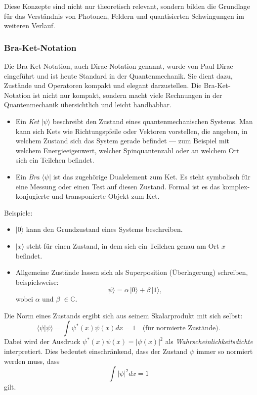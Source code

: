 	Diese Konzepte sind nicht nur theoretisch relevant, sondern bilden die Grundlage für das Verständnis von Photonen, Feldern und quantisierten Schwingungen im weiteren Verlauf.

	\subsubsection{Bra-Ket-Notation\label{fourier:subsubsection:braKetNotation}}
		Die Bra-Ket-Notation, auch Dirac-Notation genannt, wurde von Paul Dirac eingeführt und ist heute Standard in der Quantenmechanik.
		Sie dient dazu, Zustände und Operatoren kompakt und elegant darzustellen.
		Die Bra-Ket-Notation ist nicht nur kompakt, sondern macht viele Rechnungen in der Quantenmechanik übersichtlich und leicht handhabbar.

		\begin{itemize}
			\item Ein \emph{Ket} $|\psi\rangle$ beschreibt den Zustand eines quantenmechanischen Systems.
			Man kann sich Kets wie Richtungspfeile oder Vektoren vorstellen, die angeben, in welchem Zustand sich das System gerade befindet ---
			zum Beispiel mit welchem Energieeigenwert, welcher Spinquantenzahl oder an welchem Ort sich ein Teilchen befindet.
			\item Ein \emph{Bra} $\langle\psi|$ ist das zugehörige Dualelement zum Ket.
			Es steht symbolisch für eine Messung oder einen Test auf diesen Zustand.
			Formal ist es das komplex-konjugierte und transponierte Objekt zum Ket.
		\end{itemize}
		
		Beispiele:
		\begin{itemize}
		\item $|0\rangle$ kann den Grundzustand eines Systems beschreiben.
		\item $|x\rangle$ steht für einen Zustand, in dem sich ein Teilchen genau am Ort $x$ befindet.
		\item Allgemeine Zustände lassen sich als Superposition (Überlagerung) schreiben, beispielsweise:
		\[
			|\psi\rangle = \alpha\,|0\rangle + \beta\,|1\rangle,
		\]
		wobei $\alpha$ und $\beta$ $\in \mathbb{C}$.
		\end{itemize}

		Die Norm eines Zustands ergibt sich aus seinem Skalarprodukt mit sich selbst:
		\begin{equation}\label{fourier:equation:normEinesZustands}
			\langle \psi | \psi \rangle = \int \psi^*(x)\psi(x)dx = 1 \quad \text{(für normierte Zustände)}.
		\end{equation}
		Dabei wird der Ausdruck $\psi^*(x)\psi(x) = |\psi(x)|^2$ als \emph{Wahrscheinlichkeitsdichte} interpretiert.
		Dies bedeutet einschränkend, dass der Zustand $\psi$ immer so normiert werden muss, dass
		\begin{equation}
			\int |\psi|^2 dx = 1
		\end{equation}
		gilt.

